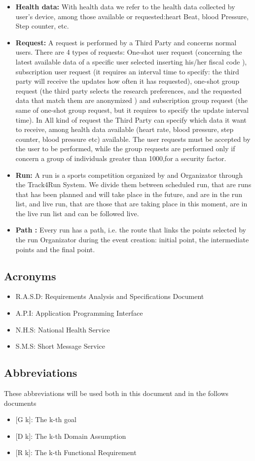 \begin{itemize}
\item\textbf{Health data:} With health data we refer to the health data collected by user's device, among those available or requested:heart Beat, blood Pressure, Step counter, etc. 
\item\textbf{Request:} A request is performed by a Third Party and concerns normal users. There are 4 types of requests: One-shot user request (concerning the latest available data of a specific user selected inserting his/her fiscal code ), subscription user request (it requires an interval time to specify: the third party will receive the updates how often it has requested), one-shot group request (the third party selects the research preferences, and the requested data that match them are anonymized ) and subscription group request (the same of one-shot group request, but it requires to specify the update interval time). In All kind of request the Third Party can specify which data it want to receive, among health data available (heart rate, blood pressure, step counter, blood pressure etc) available. The user requests must be accepted by the user to be performed, while the group requests are performed only if concern a group of individuals greater than 1000,for a security factor.
\item\textbf{Run:} A run is a sports competition organized by and Organizator through  the Track4Run System. We divide them between scheduled run, that are runs that has been planned and will take place in the future, and are in the run list, and live run, that are those that are taking place in this moment, are in the live run list and can be followed live. 
\item\textbf{Path :} Every run has a path, i.e. the route that links the points selected by the run Organizator during the event creation: initial point, the intermediate points and the final point. 

	\end{itemize}
\subsection{Acronyms}

\begin{itemize}
  \item R.A.S.D: Requirements Analysis and Specifications Document
  \item A.P.I: Application Programming Interface 
  \item N.H.S: National Health Service
  \item S.M.S: Short Message Service
\end{itemize}

\subsection{Abbreviations}
These abbreviations will be used both in this document and in the follows documents
\begin{itemize}
	\item {[}G k{]}: The k-th goal
    \item {[}D k{]}: The k-th Domain Assumption
    \item {[}R k{]}: The k-th Functional Requirement
\end{itemize}
